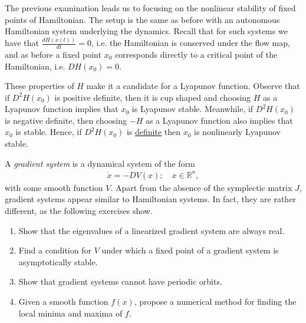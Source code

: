 The previous examination leads us to focusing on the nonlinear stability of fixed points of Hamiltonian. The setup is the same as before with an autonomous Hamiltonian system underlying the dynamics. Recall that for such systems we have that $\frac{dH(x(t))}{dt}=0$, i.e. the Hamiltonian is conserved under the flow map, and as before a fixed point $x_0$ corresponds directly to a critical point of the Hamiltonian, i.e. $DH(x_0)=0$.

These properties of $H$ make it a candidate for a Lyapunov function. Observe that if $D^{2}H(x_0)$ is positive definite, then it is cup shaped and choosing $H$ as a Lyapunov function implies that $x_0$ is Lyapunov stable. Meanwhile, if $D^{2}H(x_0)$ is negative definite, then choosing $-H$ as a Lyapunov function also implies that $x_0$ is stable. Hence, if $D^2H(x_0)$ is \underline{definite} then $x_0$ is nonlinearly Lyapunov stable.

\begin{exercise}
A \emph{gradient system} is a dynamical system of the form 
\begin{align}
\dot{x}=-DV(x);\quad x\in\mathbb{R}^{n},
\end{align}
with some smooth function $V$. Apart from the absence of the symplectic
matrix $J$, gradient systems appear similar to Hamiltonian systems.
In fact, they are rather different, as the following exercises show.
\begin{enumerate}
	\item Show that the eigenvalues of a linearized gradient system are
always real.
\item Find a condition for $V$ under which a fixed point of a gradient
system is asymptotically stable.
\item Show that gradient systems cannot have periodic orbits.
\item Given a smooth function $f\left(x\right)$, propose a numerical
method for finding the local minima and maxima of $f$.
\end{enumerate}
\end{exercise}

